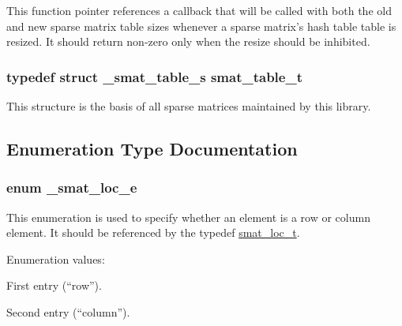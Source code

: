 This function pointer references a callback that will be called with both the old and new sparse matrix table sizes whenever a sparse matrix's hash table table is resized. It should return non-zero only when the resize should be inhibited. \hypertarget{group__dbprim__smat_a0}{
\subsubsection[smat\_\-table\_\-t]{\setlength{\rightskip}{0pt plus 5cm}typedef struct \_\-smat\_\-table\_\-s smat\_\-table\_\-t}}
\label{group__dbprim__smat_a0}


This structure is the basis of all sparse matrices maintained by this library. 

\subsection{Enumeration Type Documentation}
\hypertarget{group__dbprim__smat_a48}{
\subsubsection[\_\-smat\_\-loc\_\-e]{\setlength{\rightskip}{0pt plus 5cm}enum \_\-smat\_\-loc\_\-e}}
\label{group__dbprim__smat_a48}


This enumeration is used to specify whether an element is a row or column element. It should be referenced by the typedef \hyperlink{group__dbprim__smat_a6}{smat\_\-loc\_\-t}. \begin{Desc}
\item[Enumeration values: ]\par
\begin{description}
\item[{\em 
\hypertarget{group__dbprim__smat_a48a136}{
{\em SMAT\_\-LOC\_\-FIRST}}
\label{group__dbprim__smat_a48a136}
}]First entry (``row''). \item[{\em 
\hypertarget{group__dbprim__smat_a48a137}{
{\em SMAT\_\-LOC\_\-SECOND}}
\label{group__dbprim__smat_a48a137}
}]Second entry (``column''). \end{description}
\end{Desc}



